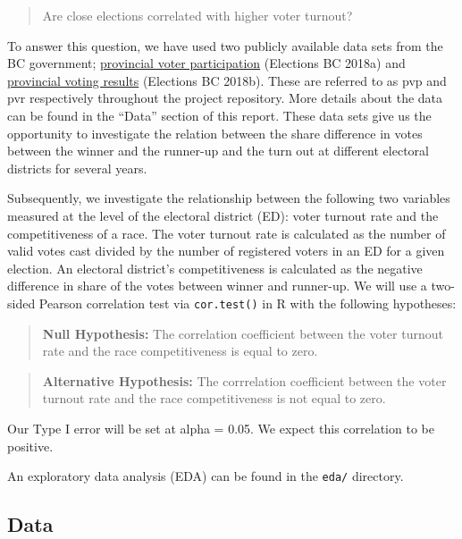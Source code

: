 \documentclass[
]{article}
\begin{document}
\begin{quote}
Are close elections correlated with higher voter turnout?
\end{quote}

To answer this question, we have used two publicly available data sets
from the BC government;
\href{https://catalogue.data.gov.bc.ca/dataset/6d9db663-8c30-43ec-922b-d541d22e634f/resource/646530d4-078c-4815-8452-c75639962bb4}{provincial
voter participation} (Elections BC 2018a) and
\href{https://catalogue.data.gov.bc.ca/dataset/44914a35-de9a-4830-ac48-870001ef8935/resource/fb40239e-b718-4a79-b18f-7a62139d9792}{provincial
voting results} (Elections BC 2018b). These are referred to as pvp and
pvr respectively throughout the project repository. More details about
the data can be found in the ``Data'' section of this report. These data
sets give us the opportunity to investigate the relation between the
share difference in votes between the winner and the runner-up and the
turn out at different electoral districts for several years.

Subsequently, we investigate the relationship between the following two
variables measured at the level of the electoral district (ED): voter
turnout rate and the competitiveness of a race. The voter turnout rate
is calculated as the number of valid votes cast divided by the number of
registered voters in an ED for a given election. An electoral district's
competitiveness is calculated as the negative difference in share of the
votes between winner and runner-up. We will use a two-sided Pearson
correlation test via \texttt{cor.test()} in R with the following
hypotheses:

\begin{quote}
\textbf{Null Hypothesis:} The correlation coefficient between the voter
turnout rate and the race competitiveness is equal to zero.
\end{quote}

\begin{quote}
\textbf{Alternative Hypothesis:} The corrrelation coefficient between
the voter turnout rate and the race competitiveness is not equal to
zero.
\end{quote}

Our Type I error will be set at alpha = 0.05. We expect this correlation
to be positive.

An exploratory data analysis (EDA) can be found in the \texttt{eda/}
directory.

\hypertarget{data}{%
\subsection{Data}\label{data}}
\end{document}
